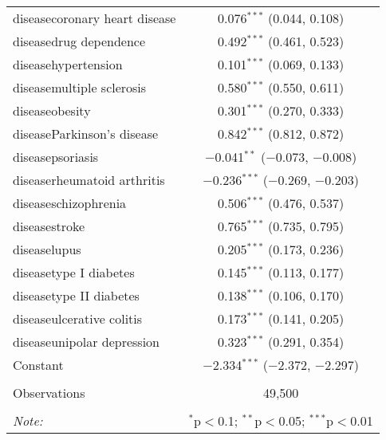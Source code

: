 \begin{table}[!htbp]
\begin{tabular}{@{\extracolsep{5pt}}lc}
  diseasecoronary heart disease & 0.076$^{***}$ (0.044, 0.108) \\ 
  diseasedrug dependence & 0.492$^{***}$ (0.461, 0.523) \\ 
  diseasehypertension & 0.101$^{***}$ (0.069, 0.133) \\ 
  diseasemultiple sclerosis & 0.580$^{***}$ (0.550, 0.611) \\ 
  diseaseobesity & 0.301$^{***}$ (0.270, 0.333) \\ 
  diseaseParkinson's disease & 0.842$^{***}$ (0.812, 0.872) \\ 
  diseasepsoriasis & $-$0.041$^{**}$ ($-$0.073, $-$0.008) \\ 
  diseaserheumatoid arthritis & $-$0.236$^{***}$ ($-$0.269, $-$0.203) \\ 
  diseaseschizophrenia & 0.506$^{***}$ (0.476, 0.537) \\ 
  diseasestroke & 0.765$^{***}$ (0.735, 0.795) \\ 
  diseaselupus & 0.205$^{***}$ (0.173, 0.236) \\ 
  diseasetype I diabetes & 0.145$^{***}$ (0.113, 0.177) \\ 
  diseasetype II diabetes & 0.138$^{***}$ (0.106, 0.170) \\ 
  diseaseulcerative colitis & 0.173$^{***}$ (0.141, 0.205) \\ 
  diseaseunipolar depression & 0.323$^{***}$ (0.291, 0.354) \\ 
  Constant & $-$2.334$^{***}$ ($-$2.372, $-$2.297) \\ 
 \hline \\[-1.8ex] 
Observations & 49,500 \\ 
\hline 
\hline \\[-1.8ex] 
\textit{Note:}  & \multicolumn{1}{r}{$^{*}$p$<$0.1; $^{**}$p$<$0.05; $^{***}$p$<$0.01} \\ 
\end{tabular} 
\end{table} 

